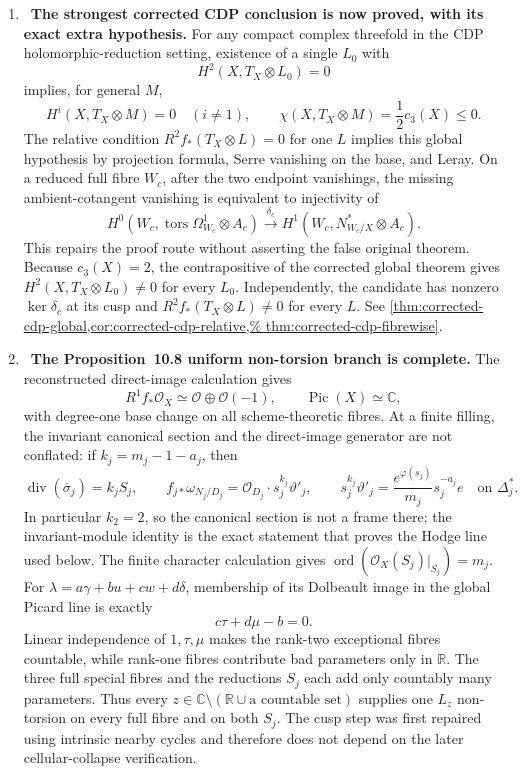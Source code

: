 \begin{enumerate}[leftmargin=1.8em,itemsep=.65em]
\item \Verified\ \textbf{The strongest corrected CDP conclusion is now
proved, with its exact extra hypothesis.}
For any compact complex threefold in the CDP holomorphic-reduction setting,
existence of a single \(L_0\) with
\[
 H^2(X,T_X\otimes L_0)=0
\]
implies, for general \(M\),
\[
 H^i(X,T_X\otimes M)=0\quad(i\ne1),\qquad
 \chi(X,T_X\otimes M)=\frac12c_3(X)\le0.
\]
The relative condition \(R^2f_*(T_X\otimes L)=0\) for one \(L\) implies
this global hypothesis by projection formula, Serre vanishing on the base,
and Leray.  On a reduced full fibre \(W_c\), after the two endpoint
vanishings, the missing ambient-cotangent vanishing is equivalent to
injectivity of
\[
 H^0(W_c,\operatorname{tors}\Omega^1_{W_c}\otimes A_c)
 \xrightarrow{\delta_c}
 H^1(W_c,N^*_{W_c/X}\otimes A_c).
\]
This repairs the proof route without asserting the false original theorem.
Because \(c_3(X)=2\), the contrapositive of the corrected global theorem gives
\(H^2(X,T_X\otimes L_0)\ne0\) for every \(L_0\).  Independently, the candidate
has nonzero \(\ker\delta_c\) at its cusp and
\(R^2f_*(T_X\otimes L)\ne0\) for every \(L\).  See
\cref{thm:corrected-cdp-global,cor:corrected-cdp-relative,%
thm:corrected-cdp-fibrewise}.

\item \Verified\ \textbf{The Proposition~10.8 uniform non-torsion branch
is complete.}
The reconstructed direct-image calculation gives
\[
R^1f_*\mathcal O_X\simeq\mathcal O\oplus\mathcal O(-1),
\qquad \operatorname{Pic}(X)\simeq\mathbb C,
\]
with degree-one base change on all scheme-theoretic fibres.  At a finite
filling, the invariant canonical section and the direct-image generator are
not conflated: if \(k_j=m_j-1-a_j\), then
\[
 \operatorname{div}(\overline\sigma_j)=k_jS_j,
 \qquad
 f_{j*}\omega_{N_j/D_j}
 =\mathcal O_{D_j}\cdot s_j^{k_j}\vartheta'_j,
 \qquad
 s_j^{k_j}\vartheta'_j
 =\frac{e^{\varphi(s_j)}}{m_j}s_j^{-a_j}e
 \quad\text{on }\Delta_j^*.
\]
In particular \(k_2=2\), so the canonical section is not a frame there;
the invariant-module identity is the exact statement that proves the Hodge
line used below.  The finite
character calculation gives
\(\operatorname{ord}(\mathcal O_X(S_j)|_{S_j})=m_j\).  For
\(\lambda=a\gamma+bu+cw+d\delta\), membership of its Dolbeault image in
the global Picard line is exactly
\[
c\tau+d\mu-b=0.
\]
Linear independence of \(1,\tau,\mu\) makes the rank-two exceptional
fibres countable, while rank-one fibres contribute bad parameters only in
\(\mathbb R\).  The three full special fibres and the reductions \(S_j\)
each add only countably many parameters.  Thus every
\(z\in\mathbb C\setminus(\mathbb R\cup\text{a countable set})\) supplies
one \(L_z\) non-torsion on every full fibre and on both \(S_j\).
The cusp step was first repaired using intrinsic nearby cycles and therefore
does not depend on the later cellular-collapse verification.


\end{enumerate}
